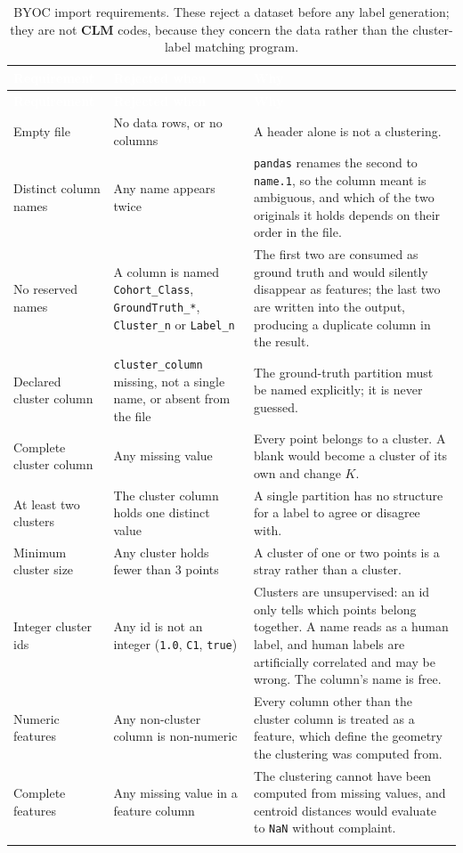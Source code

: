 \documentclass[a4paper,11pt]{article}
\newcommand{\vcode}[1]{\textcolor{valred}{\bfseries\ttfamily #1}}
\newcommand{\headrow}{\rowcolor{headblue}}
\newcommand{\hc}[1]{\textcolor{white}{\bfseries #1}}
\begin{document}
\begin{longtable}{@{}L{4.0cm} L{5.2cm} L{6.4cm}@{}}
\toprule
\headrow \hc{Requirement} & \hc{Rejected when} & \hc{Why} \\
\midrule
\endfirsthead
\headrow \hc{Requirement} & \hc{Rejected when} & \hc{Why} \\ \midrule
\endhead
Empty file & No data rows, or no columns & A header alone is not a clustering. \\
Distinct column names & Any name appears twice & \texttt{pandas} renames the second to \texttt{name.1}, so the column meant is ambiguous, and which of the two originals it holds depends on their order in the file. \\
No reserved names & A column is named \texttt{Cohort\_Class}, \texttt{GroundTruth\_*}, \texttt{Cluster\_n} or \texttt{Label\_n} & The first two are consumed as ground truth and would silently disappear as features; the last two are written into the output, producing a duplicate column in the result. \\
Declared cluster column & \texttt{cluster\_column} missing, not a single name, or absent from the file & The ground-truth partition must be named explicitly; it is never guessed. \\
Complete cluster column & Any missing value & Every point belongs to a cluster. A blank would become a cluster of its own and change $K$. \\
At least two clusters & The cluster column holds one distinct value & A single partition has no structure for a label to agree or disagree with. \\
Minimum cluster size & Any cluster holds fewer than $3$ points & A cluster of one or two points is a stray rather than a cluster. \\
Integer cluster ids & Any id is not an integer (\texttt{1.0}, \texttt{C1}, \texttt{true}) & Clusters are unsupervised: an id only tells which points belong together. A name reads as a human label, and human labels are artificially correlated and may be wrong. The column's name is free. \\
Numeric features & Any non-cluster column is non-numeric & Every column other than the cluster column is treated as a feature, which define the geometry the clustering was computed from. \\
Complete features & Any missing value in a feature column & The clustering cannot have been computed from missing values, and centroid distances would evaluate to \texttt{NaN} without complaint. \\
\bottomrule
\caption{BYOC import requirements. These reject a dataset before any label generation; they are not \vcode{CLM} codes, because they concern the data rather than the cluster-label matching program.}
\end{longtable}
\end{document}
